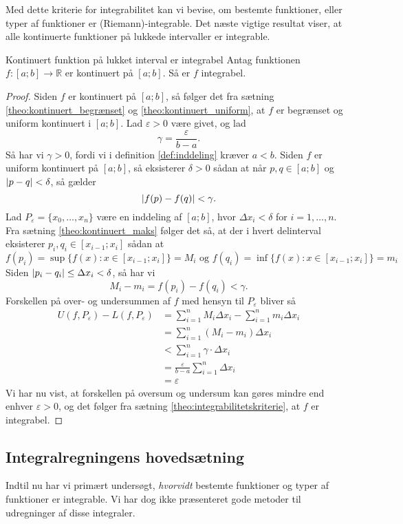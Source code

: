 Med dette kriterie for integrabilitet kan vi bevise, om bestemte funktioner, eller typer af funktioner er (Riemann)-integrable.
Det næste vigtige resultat viser, at alle kontinuerte funktioner på lukkede intervaller er integrable.

\begin{theorem}[label=theo:kontinuert_integrabel]{Kontinuert funktion på lukket interval er integrabel}{}
  Antag funktionen $f:[a;b] \to \mathbb{R}$ er kontinuert på $[a;b]$. 
  Så er $f$ integrabel. 
\end{theorem}
\begin{proof} 
  Siden $f$ er kontinuert på $[a;b]$, så følger det fra sætning \ref{theo:kontinuert_begrænset} og \ref{theo:kontinuert_uniform}, at $f$ er begrænset og uniform kontinuert i $[a;b]$. 
  Lad $\varepsilon > 0$ være givet, og lad 
  \[
  \gamma = \frac{\varepsilon }{b-a}.
  \] 
  Så har vi $\gamma >0$, fordi vi i definition \ref{def:inddeling} kræver $a<b$. 
  Siden $f$ er uniform kontinuert på $[a;b]$, så eksisterer $\delta >0$ sådan at når $p, q \in [a;b]$ og $\abs{p-q} < \delta  $, så gælder
  \[
  \abs{f(p)-f(q)} < \gamma.
  \] 
  Lad $P _{\varepsilon }=\{ x _{0}, \ldots , x_n \} $ være en inddeling af $[a;b]$, hvor $\Delta x_i < \delta  $ for $i=1, \ldots , n$. 
  Fra sætning \ref{theo:kontinuert_maks} følger det så, at der i hvert delinterval eksisterer $p_i, q_i \in [x_{i-1}; x _{i}]$ sådan at
  \[
  f(p_i)=\sup \{ f(x): x \in [x _{i-1};x _{i}]\} = M_i \text{ og } f(q_i)=\inf \{ f(x): x \in [x _{i-1};x _{i}]\} = m_i
  \] 
  Siden $\abs{p_i - q_i} \leq \Delta x_i < \delta$, så har vi 
\[
  M_i-m_i = f(p_i) - f(q_i) < \gamma. 
\] 
Forskellen på over- og undersummen af $f$ med hensyn til $P _{\varepsilon }$ bliver så
\begin{equation*}
\begin{split}
  U(f, P _{\varepsilon }) - L(f, P _{\varepsilon }) &= \sum_{i=1}^{n} M_i \Delta x_i - \sum_{i=1}^{n} m_i \Delta x_i\\
  &=\sum_{i=1}^{n} \left(M_i - m_i\right) \Delta x_i \\
  &<\sum_{i=1}^{n} \gamma \cdot \Delta x_i \\
  &=\frac{\varepsilon }{b-a} \sum_{i=1}^{n} \Delta x_i \\
  &=\varepsilon 
\end{split}
\end{equation*}
Vi har nu vist, at forskellen på oversum og undersum kan gøres mindre end enhver $\varepsilon >0$, og det følger fra sætning \ref{theo:integrabilitetskriterie}, at $f$ er integrabel. 
\end{proof}



\subsection{Integralregningens hovedsætning}%
\label{sub:Integralregningens hovedsætning}
Indtil nu har vi primært undersøgt, \textit{hvorvidt} bestemte funktioner og typer af funktioner er integrable.
Vi har dog ikke præsenteret gode metoder til udregninger af disse integraler.
